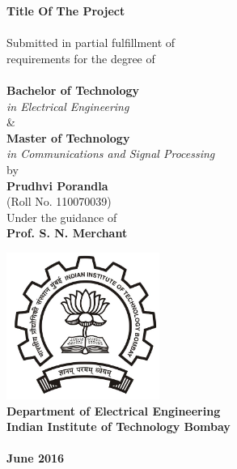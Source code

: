 \begin{titlepage}
	\begin{center}

		{\Huge \bfseries
		Title Of The Project\\
		}~\\[1cm]


		{\large
		Submitted in partial fulfillment of \\ 
		requirements for the degree of\\
		}~\\[0.20cm]

		{\large \bfseries
		Bachelor of Technology
		}\\
		\textit{
			in Electrical Engineering} \\
		\& \\

		{\large \bfseries
		Master of Technology
		}\\
		\textit{
			in Communications and Signal Processing
		} \\[1cm]
		by \\[0.25cm]
		{\large \bfseries
		Prudhvi Porandla\\
		}(Roll No. 110070039)~\\[1cm]
		Under the guidance of \\[0.25cm]
		{\large \bfseries
		Prof. S. N. Merchant
			}
		\vfill

		\includegraphics[width=5cm]{figures/iitbblack.jpg}~\\[0.5cm]

		{\large \bfseries
		Department of Electrical Engineering\\
		Indian Institute of Technology Bombay\\
		\mbox{} \\
		\textbf{June 2016}}

	\end{center}
\end{titlepage}
